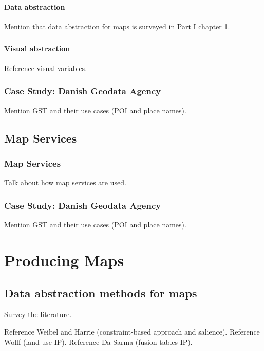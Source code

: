 \documentclass[11pt, oneside]{report}   	%
\begin{document}
\subsection{Data abstraction}
Mention that data abstraction for maps is surveyed in Part I chapter 1.

\subsubsection{}

\subsection{Visual abstraction}
Reference visual variables.

\section{Case Study: Danish Geodata Agency}
Mention GST and their use cases (POI and place names).

\chapter{Map Services}

\section{Map Services}
Talk about how map services are used.

\section{Case Study: Danish Geodata Agency}
Mention GST and their use cases (POI and place names).


\part{Producing Maps}

\chapter{Data abstraction methods for maps}
Survey the literature.

Reference Weibel and Harrie (constraint-based approach and salience). Reference Wollf (land use IP). Reference Da Sarma (fusion tables IP).


\chapter{}
\end{document}
